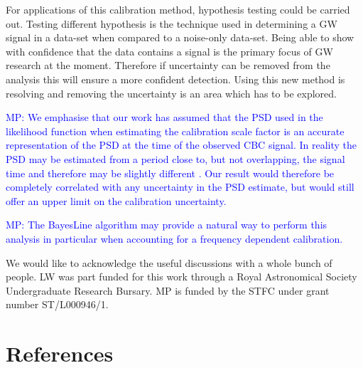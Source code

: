 \documentclass[10pt]{iopart}
\newcommand{\MP}[1]{\textcolor{blue}{MP: #1}}
\begin{document}
For applications of this calibration method, hypothesis testing could be
carried out. Testing different hypothesis is the technique used in determining
a GW signal in a data-set when compared to a noise-only data-set. Being able to
show with confidence that the data contains a signal is the primary focus of GW
research at the moment. Therefore if uncertainty can be removed from the
analysis this will ensure a more confident detection. Using this new method is
resolving and removing the uncertainty is an area which has to be explored.

\MP{We emphasise that our work has assumed that the PSD used in the likelihood function
when estimating the calibration scale factor is an accurate representation of the
PSD at the time of the observed CBC signal. In reality the PSD may be estimated from
a period close to, but not overlapping, the signal time and therefore may be slightly
different \cite{2013PhRvD..88h4044L}. Our result would therefore be completely correlated
with any uncertainty in the PSD estimate, but would still offer an upper limit
on the calibration uncertainty.}

\MP{The BayesLine algorithm \cite{2015PhRvD..91h4034L} may provide a natural
way to perform this analysis in particular when accounting for a frequency
dependent calibration.}

\ack

We would like to acknowledge the useful discussions with a whole bunch
of people. LW was part funded for this work through a Royal Astronomical
Society Undergraduate Research Bursary.
MP is funded by the STFC under grant number ST/L000946/1.

\section*{References}



\end{document}
